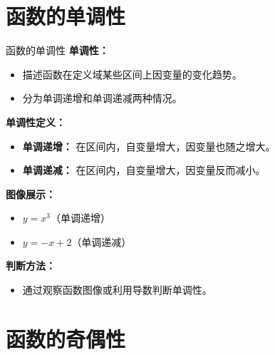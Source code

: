 \documentclass[aspectratio=169]{ctexbeamer} %
\begin{document}
\section{函数的单调性}
\begin{frame}{函数的单调性}
    \textbf{单调性：}
    \begin{itemize}
        \item 描述函数在定义域某些区间上因变量的变化趋势。
        \item 分为单调递增和单调递减两种情况。
    \end{itemize}

    \vspace{0.5cm}
    \textbf{单调性定义：}
    \begin{itemize}
        \item \textbf{单调递增：} 在区间内，自变量增大，因变量也随之增大。
        \item \textbf{单调递减：} 在区间内，自变量增大，因变量反而减小。
    \end{itemize}

    \vspace{0.5cm}
    \textbf{图像展示：}
    \begin{itemize}
        \item \( y = x^3 \)（单调递增）
        \item \( y = -x + 2 \)（单调递减）
    \end{itemize}

    \vspace{0.5cm}
    \textbf{判断方法：}
    \begin{itemize}
        \item 通过观察函数图像或利用导数判断单调性。
    \end{itemize}
\end{frame}

\section{函数的奇偶性}
\end{document}
